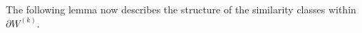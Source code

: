 \documentclass[titlepage,reqno,10pt]{amsart}
\theoremstyle{definition}
\newcommand{\tm}{\subseteq}
\begin{document}
 
The following lemma now describes the structure of the similarity classes within $\partial W^{(k)}$.
\end{document}
